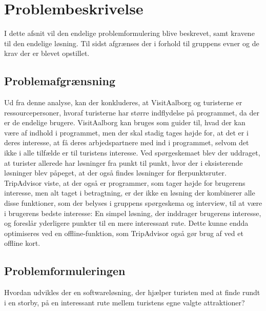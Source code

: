 \chapter{Problembeskrivelse}

I dette afsnit vil den endelige problemformulering blive beskrevet, samt kravene til den endelige løsning. Til sidst afgrænses der i forhold til gruppens evner og de krav der er blevet opstillet. 

\section{Problemafgrænsning}
Ud fra denne analyse, kan der konkluderes, at VisitAalborg og turisterne er ressourcepersoner, hvoraf turisterne har større indflydelse på programmet, da der er de endelige brugere. VisitAalborg kan bruges som guider til, hvad der kan være af indhold i programmet, men der skal stadig tages højde for, at det er i deres interesse, at få deres arbjedspartnere med ind i programmet, selvom det ikke i alle tilfælde er til turistens interesse.
Ved spørgeskemaet blev der uddraget, at turister allerede har løsninger fra punkt til punkt, hvor der i eksisterende løsninger blev påpeget, at der også findes løsninger for flerpunktsruter. TripAdvisor viste, at der også er programmer, som tager højde for brugerens interesse, men alt taget i betragtning, er der ikke en løsning der kombinerer alle disse funktioner, som der belyses i gruppens spørgeskema og interview, til at være i brugerens bedste interesse: En simpel løsning, der inddrager brugerens interesse, og foreslår yderligere punkter til en mere interessant rute. Dette kunne endda optimiseres ved en offline-funktion, som TripAdvisor også gør brug af ved et offline kort.

\section{Problemformuleringen}
Hvordan udvikles der en softwareløsning, der hjælper turisten med at finde rundt i en storby, på en interessant rute mellem turistens egne valgte attraktioner?
